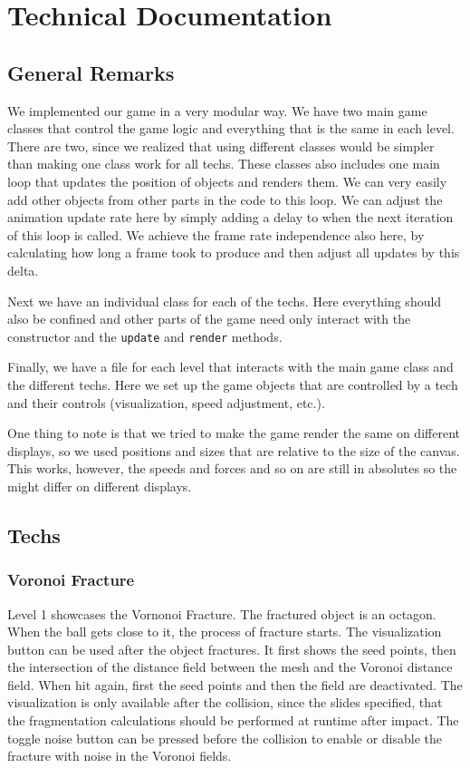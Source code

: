 \documentclass{article}
\begin{document}
\section{Technical Documentation}

\subsection{General Remarks}
We implemented our game in a very modular way. We have two main game classes that control the game logic 
and everything that is the same in each level. There are two, since we realized that using different classes would be simpler than making one class work for all techs. These classes also includes one main loop that 
updates the position of objects and renders them. We can very easily add other objects from other parts in the 
code to this loop. We can adjust the animation update rate here 
by simply adding a delay to when the next iteration of this loop is called. 
We achieve the frame rate independence also here, by calculating how long a frame took to produce 
and then adjust all updates by this delta. 

Next we have an individual class for each of the techs. Here everything should 
also be confined and other parts of the game need only interact with the constructor
and the \texttt{update} and \texttt{render} methods.

Finally, we have a file for each level that interacts with the main game 
class and the different techs. Here we set up
the game objects that are controlled by a tech and their controls (visualization, speed adjustment, etc.).

One thing to note is that we tried to make the game render the same on different displays, so we used 
positions and sizes that are relative to the size of the canvas. This works, however, the speeds and forces and so 
on are still in absolutes so the might differ on different displays.

\subsection{Techs}

\subsubsection{Voronoi Fracture}
Level 1 showcases the Vornonoi Fracture. The fractured object is an octagon. When the ball gets close to it, the process of fracture starts. The visualization button can be used after the object fractures. It first shows the seed points, then the intersection of the distance field between the mesh and the Voronoi distance field. When hit again, first the seed points and then the field are deactivated. The visualization is only available after the collision, since the slides specified, that the fragmentation calculations should be performed at runtime after impact. The toggle noise button can be pressed before the collision to enable or disable the fracture with noise in the Voronoi fields.
\end{document}
